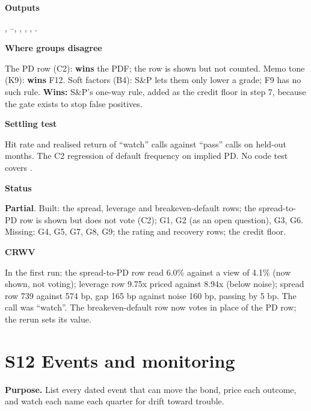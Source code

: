 \documentclass[11pt]{article}
\newcommand{\stpartial}{\textcolor{warn}{\textbf{Partial}}}
\newcommand{\fld}[1]{\par\medskip\noindent\textbf{\textcolor{steel}{#1}}\par\nopagebreak}
\begin{document}
\fld{Outputs} , --, , , , .

\fld{Where groups disagree} The PD row (C2): \textbf{wins} the PDF; the row is shown but not counted. Memo tone (K9): \textbf{wins} F12. Soft factors (B4): S\&P lets them only lower a grade; F9 has no such rule. \textbf{Wins:} S\&P's one-way rule, added as the credit floor in step 7, because the gate exists to stop false positives.

\fld{Settling test} Hit rate and realised return of ``watch'' calls against ``pass'' calls on held-out months. The C2 regression of default frequency on implied PD. No code test covers .

\fld{Status} \stpartial. Built: the spread, leverage and breakeven-default rows; the spread-to-PD row is shown but does not vote (C2); G1, G2 (as an open question), G3, G6. Missing: G4, G5, G7, G8, G9; the rating and recovery rows; the credit floor.

\fld{CRWV} In the first run: the spread-to-PD row read 6.0\% against a view of 4.1\% (now shown, not voting); leverage row 9.75x priced against 8.94x (below noise); spread row 739 against 574 bp, gap 165 bp against noise 160 bp, passing by 5 bp. The call was ``watch''. The breakeven-default row now votes in place of the PD row; the rerun sets its value.

\section{S12 Events and monitoring}\label{s12}

\textbf{Purpose.} List every dated event that can move the bond, price each outcome, and watch each name each quarter for drift toward trouble.
\end{document}
